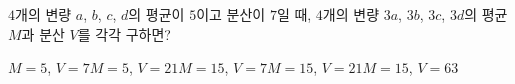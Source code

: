 $4$개의 변량 $a$, $b$, $c$, $d$의 평균이 $5$이고 분산이 $7$일 때, $4$개의 변량 $3a$, $3b$, $3c$, $3d$의 평균 $M$과 분산 $V$를 각각 구하면?
\begin{choicesii}{$M=5$, $V=7$}{$M=5$, $V=21$}{$M=15$, $V=7$}{$M=15$, $V=21$}{$M=15$, $V=63$}\end{choicesii}
